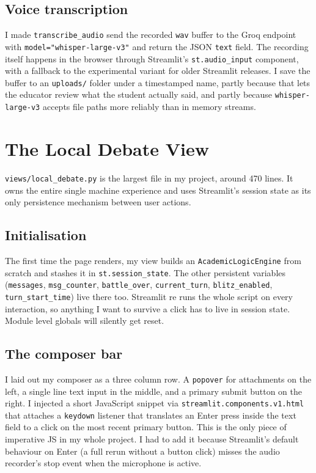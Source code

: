 \subsection{Voice transcription}
I made \texttt{transcribe\_audio} send the recorded \texttt{wav} buffer to the Groq endpoint with \texttt{model="whisper-large-v3"} and return the JSON \texttt{text} field. The recording itself happens in the browser through Streamlit's \texttt{st.audio\_input} component, with a fallback to the experimental variant for older Streamlit releases. I save the buffer to an \texttt{uploads/} folder under a timestamped name, partly because that lets the educator review what the student actually said, and partly because \texttt{whisper-large-v3} accepts file paths more reliably than in memory streams.

\section{The Local Debate View}
\label{sec:impl_local}
\texttt{views/local\_debate.py} is the largest file in my project, around 470 lines. It owns the entire single machine experience and uses Streamlit's session state as its only persistence mechanism between user actions.

\subsection{Initialisation}
The first time the page renders, my view builds an \texttt{AcademicLogicEngine} from scratch and stashes it in \texttt{st.session\_state}. The other persistent variables (\texttt{messages}, \texttt{msg\_counter}, \texttt{battle\_over}, \texttt{current\_turn}, \texttt{blitz\_enabled}, \texttt{turn\_start\_time}) live there too. Streamlit re runs the whole script on every interaction, so anything I want to survive a click has to live in session state. Module level globals will silently get reset.

\subsection{The composer bar}
I laid out my composer as a three column row. A \texttt{popover} for attachments on the left, a single line text input in the middle, and a primary submit button on the right. I injected a short JavaScript snippet via \texttt{streamlit.components.v1.html} that attaches a \texttt{keydown} listener that translates an Enter press inside the text field to a click on the most recent primary button. This is the only piece of imperative JS in my whole project. I had to add it because Streamlit's default behaviour on Enter (a full rerun without a button click) misses the audio recorder's stop event when the microphone is active.

